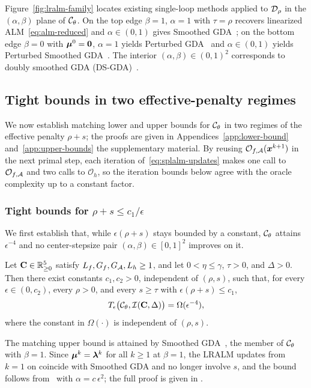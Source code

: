 Figure~\ref{fig:lralm-family} locates existing single-loop methods applied
to \(\mathcal{D}_\rho\) in the \((\alpha,\beta)\) plane of \(\mathcal{C}_\theta\). On the
top edge \(\beta=1\), \(\alpha=1\) with \(\tau=\rho\) recovers linearized
ALM~\eqref{eq:alm-reduced} and \(\alpha\in(0,1)\) gives
Smoothed GDA~\cite{zhang2020smoothed}; on the bottom edge \(\beta=0\)
with \(\bm{\mu}^0=\bm{0}\), \(\alpha=1\) yields Perturbed
GDA~\cite{lu2020hybrid,xu2023unified} and \(\alpha\in(0,1)\) yields
Perturbed Smoothed GDA~\cite{li2026smoothing}. The interior
\((\alpha,\beta)\in(0,1)^2\) corresponds to doubly smoothed GDA
(DS-GDA)~\cite{zheng2023universal}.

\subsection{\texorpdfstring{Tight bounds in two effective-penalty regimes}{Tight bounds in two effective-penalty regimes}}
\label{sec:lower-bound}

We now establish matching lower and upper bounds for \(\mathcal{C}_\theta\) in
two regimes of the effective penalty \(\rho+s\); the proofs are given in
\ifsupp Appendices~\ref{app:lower-bound} and~\ref{app:upper-bounds}\else
the supplementary material\fi. By reusing
\(\mathcal O_{f,\mathcal{A}}(\bm{x}^{k+1})\) in the next primal step, each iteration
of~\eqref{eq:splalm-updates} makes one call to \(\mathcal O_{f,\mathcal{A}}\) and
two calls to \(\mathcal O_h\), so the iteration bounds below agree with the
oracle complexity up to a constant factor.

\subsubsection{Tight bounds for \texorpdfstring{\(\rho+s\le c_1/\epsilon\)}{rho+s <= c1/epsilon}} 

We first establish that, while \(\epsilon(\rho+s)\) stays bounded by a
constant, \(\mathcal{C}_\theta\) attains \(\epsilon^{-4}\) and no
center-stepsize pair \((\alpha,\beta)\in[0,1]^2\) improves on it.

\begin{theorem}
\label{thm:lower-bound}
Let \(\mathbf C\in\mathbb{R}^5_{\ge0}\) satisfy \(L_f,G_f,G_{\mathcal{A}},L_h\ge1\),
and let \(0<\eta\le\gamma\), \(\tau>0\), and \(\Delta>0\). Then there exist
constants \(c_1,c_2>0\), independent of \((\rho,s)\), such
that, for every \(\epsilon\in(0,c_2)\), every \(\rho>0\), and every
\(s\ge\tau\) with \(\epsilon(\rho+s)\le c_1\),
\[
    T_\epsilon\bigl(\mathcal{C}_\theta,\mathcal I(\mathbf C,\Delta)\bigr)
    =\Omega(\epsilon^{-4}),
\]
where the constant in \(\Omega(\cdot)\) is independent of \((\rho,s)\).
\end{theorem}
The matching upper bound is attained by Smoothed GDA~\cite{zhang2020smoothed}, 
the member of \(\mathcal{C}_\theta\) with \(\beta=1\). Since
\(\bm{\mu}^k=\bm{\lambda}^k\) for all \(k\ge1\) at \(\beta=1\), the LRALM updates
from \(k=1\) on coincide with Smoothed GDA and no longer involve \(s\), and the
bound follows
from~\cite[Theorem~B.1]{li2026smoothing} with \(\alpha=c\,\epsilon^2\); the
full proof is given in .

